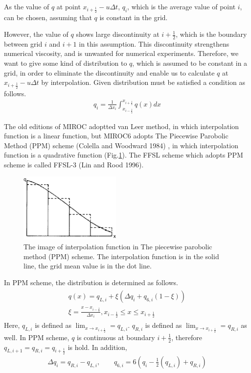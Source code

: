 As the value of \(q\) at point \(x_{i+\frac{1}{2}}-u\Delta t\), \(q_{i}\), which is the average value of point \(i\), can be chosen, assuming that \(q\) is constant in the grid.

However, the value of \(q\) shows large discontinuity at \(i+\frac{1}{2}\), which is the boundary between grid \(i\) and \(i+1\) in this assumption. This discontinuity strengthens numerical viscosity,
and is unwanted for numerical experiments. Therefore, we want to give some kind of distribution to \(q\), which is assumed to be constant in a grid, in order to eliminate the discontinuity and enable
us to calculate \(q\) at \(x_{i+\frac{1}{2}}-u\Delta t\) by interpolation. Given distribution must be satisfied a condition as follows.
\begin{eqnarray}q_{i}=\frac{1}{\Delta x_{i}} \int_{x_{i-\frac{1}{2}}}^{x_{i+\frac{1}{2}}} q(x) dx\end{eqnarray}

The old editions of MIROC adoptted van Leer method, in which interpolation function is a linear function, but MIROC6 adopts The Piecewise Parobolic Method (PPM) scheme (Colella and Woodward 1984) , in
which interpolation function is a quadrative function (Fig.\ref{f1}). The FFSL scheme which adopts PPM scheme is called FFSL-3 (Lin and Rood 1996).

\begin{figure}
\hypertarget{f1}{%
\centering
\includegraphics[width=5cm,height=\textheight]{ppm_interpolate.png}
\caption{The image of interpolation function in The piecewise parobolic method (PPM) scheme. The interpolation function is in the solid line, the grid mean value is in the dot line.}\label{f1}
}
\end{figure}

In PPM scheme, the distribution is determined as follows. \begin{eqnarray}\begin{split}
\label{a4}
  q(x)=q_{L,i}+\xi (\Delta q_{i}+q_{6,i}(1-\xi))\\
  \xi=\frac{x-x_{i-\frac{1}{2}}}{\Delta x_{i}},  x_{i-\frac{1}{2}}\leq x \leq x_{i+\frac{1}{2}}
  \end{split}\end{eqnarray} Here, \(q_{L,i}\) is defined as \(\lim_{x \to x_{i+\frac{1}{2}}}=q_{L,i}\). \(q_{R,i}\) is defined as \(\lim_{x \to x_{i+\frac{1}{2}}}=q_{R,i}\) as well. In PPM scheme, \(q\) is
continuous at boundary \(i+\frac{1}{2}\), therefore \(q_{L,i+1}=q_{R,i}=q_{i+\frac{1}{2}}\) is hold. In addition, \begin{eqnarray}\Delta q_{i}=q_{R,i}-q_{L,i},\qquad q_{6,i}=6(q_{i}-\frac{1}{2}(q_{L,i})+q_{R,i})\end{eqnarray}

